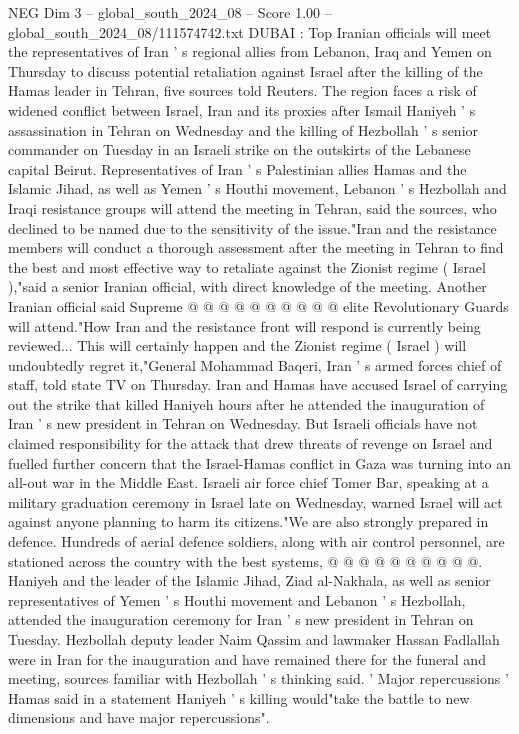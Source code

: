 \begin{textsample}{NEG Dim 3 – global\_south\_2024\_08 – Score 1.00 – global\_south\_2024\_08/111574742.txt}  \label{ex:f3_neg_126}
DUBAI : Top Iranian officials will meet the representatives of Iran ' s regional allies from Lebanon, Iraq and Yemen on Thursday to discuss potential retaliation against Israel after the killing of the Hamas leader in Tehran, five sources told Reuters.
The region faces a risk of widened conflict between Israel, Iran and its proxies after Ismail Haniyeh ' s assassination in Tehran on Wednesday and the killing of Hezbollah ' s senior commander on Tuesday in an Israeli strike on the outskirts of the Lebanese capital Beirut.
Representatives of Iran ' s Palestinian allies Hamas and the Islamic Jihad, as well as Yemen ' s Houthi movement, Lebanon ' s Hezbollah and Iraqi resistance groups will attend the meeting in Tehran, said the sources, who declined to be named due to the sensitivity of the issue."Iran and the resistance members will conduct a thorough assessment after the meeting in Tehran to find the best and most effective way to retaliate against the Zionist regime ( Israel ),"said a senior Iranian official, with direct knowledge of the meeting.
Another Iranian official said Supreme @ @ @ @ @ @ @ @ @ @ elite Revolutionary Guards will attend."How Iran and the resistance front will respond is currently being reviewed...
This will certainly happen and the Zionist regime ( Israel ) will undoubtedly regret it,"General Mohammad Baqeri, Iran ' s armed forces chief of staff, told state TV on Thursday.
Iran and Hamas have accused Israel of carrying out the strike that killed Haniyeh hours after he attended the inauguration of Iran ' s new president in Tehran on Wednesday.
But Israeli officials have not claimed responsibility for the attack that drew threats of revenge on Israel and fuelled further concern that the Israel-Hamas conflict in Gaza was turning into an all-out war in the Middle East.
Israeli air force chief Tomer Bar, speaking at a military graduation ceremony in Israel late on Wednesday, warned Israel will act against anyone planning to harm its citizens."We are also strongly prepared in defence.
Hundreds of aerial defence soldiers, along with air control personnel, are stationed across the country with the best systems, @ @ @ @ @ @ @ @ @ @.
Haniyeh and the leader of the Islamic Jihad, Ziad al-Nakhala, as well as senior representatives of Yemen ' s Houthi movement and Lebanon ' s Hezbollah, attended the inauguration ceremony for Iran ' s new president in Tehran on Tuesday.
Hezbollah deputy leader Naim Qassim and lawmaker Hassan Fadlallah were in Iran for the inauguration and have remained there for the funeral and meeting, sources familiar with Hezbollah ' s thinking said. ' Major repercussions ' Hamas said in a statement Haniyeh ' s killing would"take the battle to new dimensions and have major repercussions".

\end{textsample}
